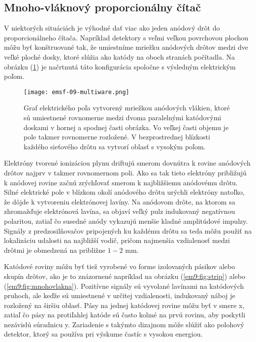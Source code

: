 \documentclass[../../main.tex]{subfiles}
\begin{document}
\subsection{Mnoho-vláknový proporcionálny čítač}
V niektorých situáciách je výhodné dať viac ako jeden anódový drôt do proporcionálneho čítača. Napríklad detektory s veľmi veľkou povrchovou plochou môžu byť konštruované tak, že umiestníme mriežku anódových drôtov medzi dve veľké ploché dosky, ktoré slúžia ako katódy na oboch stranách počítadla. Na obrázku (\ref{em9:fig:multiware}) je načrtnutá táto konfigurácia spoločne s výsledným elektrickým poľom.

\begin{figure}[!h]
\texttt{[image: emsf-09-multiware.png]}
\centering
\caption{Graf elektrického poľa vytvorený mriežkou anódových vlákien, ktoré sú umiestnené rovnomerne medzi dvoma paralelnými katódovými doskami v hornej a spodnej časti obrázka. Vo veľkej časti objemu je pole takmer rovnomerne rozložené. V bezprostrednej blízkosti každého sieťového drôtu sa vytvorí oblasť s vysokým poľom.}
\label{em9:fig:multiware}
\end{figure}

Elektróny tvorené ionizáciou plynu driftujú smerom dovnútra k rovine anódových drôtov najprv v takmer rovnomernom poli. Ako sa tak tieto elektróny približujú k anódovej rovine začnú zrýchľovať smerom k najbližšiemu anódovému drôtu. Silné elektrické pole v blízkom okolí anódového drôtu urýchli elektróny natoľko, že dôjde k vytvoreniu elektrónovej lavíny. Na anódovom drôte, na ktorom sa zhromažďuje elektrónová lavína, sa objaví veľký pulz indukovaný negatívnou polaritou, zatiaľ čo susedné anódy vykazujú menšie kladné amplitúdové impulzy. Signály z predzosilňovačov pripojených ku každému drôtu sa teda môžu použiť na lokalizáciu udalosti na najbližší vodič, pričom najmenšia vzdialenosť medzi drôtmi je obmedzená na približne $1-2$ mm.

Katódové roviny môžu byť tiež vyrobené vo forme izolovaných pásikov alebo skupín drôtov, ako je to znázornené napríklad na obrázku (\ref{em9:fig:strip}) alebo (\ref{em9:fig:mnohovlakna}). Pozitívne signály sú vyvolané lavínami na katódových pruhoch, ale keďže sú umiestnené v určitej vzdialenosti, indukovaný náboj je rozložený na širšiu oblasť. Pásy na jednej katódovej rovine môžu byť v smere x, zatiaľ čo pásy na protiľahlej katóde sú často kolmé na prvú rovinu, aby poskytli nezávislú súradnicu y. Zariadenie s takýmto dizajnom môže slúžiť ako polohový detektor, ktorý sa používa pri výskume častíc s vysokou energiou.
\end{document}
